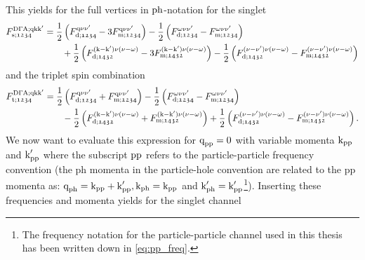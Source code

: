 \documentclass[../../main.tex]{subfiles}
\begin{document}
This yields for the full vertices in $\text{ph}$-notation for the singlet
\begin{align}
\begin{split}
	F_{\text{s};\mathfrak{1234}}^{\text{D}\Gamma\text{A};\text{q}\text{k}\text{k}'}&=\frac12\left (F_{\text{d};\mathfrak{1234}}^{\text{q}\nu\nu'}-3F_{\text{m};\mathfrak{1234}}^{\text{q}\nu\nu'}\right )-\frac12\left (F_{\text{d};\mathfrak{1234}}^{\omega\nu\nu'}-F_{\text{m};\mathfrak{1234}}^{\omega\nu\nu'}\right )\\
	&\qquad+\frac12\left (F_{\text{d};\mathfrak{1432}}^{(\text{k}-\text{k}')\nu(\nu-\omega)}-3F_{\text{m};\mathfrak{1432}}^{(\text{k}-\text{k}')\nu(\nu-\omega)}\right )-\frac12\left (F_{\text{d};\mathfrak{1432}}^{(\nu-\nu')\nu(\nu-\omega)}-F_{\text{m};\mathfrak{1432}}^{(\nu-\nu')\nu(\nu-\omega)}\right )
\end{split}
\end{align}
and the triplet spin combination
\begin{align}
\begin{split}
	F_{\text{t};\mathfrak{1234}}^{\text{D}\Gamma\text{A};\text{q}\text{k}\text{k}'}&=\frac12\left (F_{\text{d};\mathfrak{1234}}^{\text{q}\nu\nu'}+F_{\text{m};\mathfrak{1234}}^{\text{q}\nu\nu'}\right )-\frac12\left (F_{\text{d};\mathfrak{1234}}^{\omega\nu\nu'}-F_{\text{m};\mathfrak{1234}}^{\omega\nu\nu'}\right )\\
	&\qquad-\frac12\left (F_{\text{d};\mathfrak{1432}}^{(\text{k}-\text{k}')\nu(\nu-\omega)}+F_{\text{m};\mathfrak{1432}}^{(\text{k}-\text{k}')\nu(\nu-\omega)}\right )+\frac12\left (F_{\text{d};\mathfrak{1432}}^{(\nu-\nu')\nu(\nu-\omega)}-F_{\text{m};\mathfrak{1432}}^{(\nu-\nu')\nu(\nu-\omega)}\right ).
\end{split}
\end{align}
We now want to evaluate this expression for $\text{q}_{\text{pp}}=0$ with variable momenta $\text{k}_{\text{pp}}$ and $\text{k}'_{\text{pp}}$ where the subscript $\text{pp}$ refers to the particle-particle frequency convention (the ph momenta in the particle-hole convention are related to the pp momenta as: $\text{q}_{\text{ph}}=\text{k}_{\text{pp}}+\text{k}'_{\text{pp}}, \text{k}_{\text{ph}}=\text{k}_{\text{pp}}$ and $\text{k}'_{\text{ph}}=\text{k}'_{\text{pp}}$\footnote{The frequency notation for the particle-particle channel used in this thesis has been written down in \eqref{eq:pp_freq}.}). Inserting these frequencies and momenta yields for the singlet channel
\end{document}
